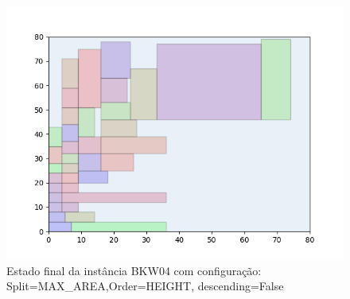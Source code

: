 \begin{figure}[H]
    \centering
    \caption[]{Estado final da instância BKW04 com configuração: Split=MAX_AREA,Order=HEIGHT, descending=False}
    \label{fig:bkw04-max_area-height-false}
    \includegraphics[scale=0.5]{output/figures/bkw/bkw04/max_area/height/false/00}
\end{figure}